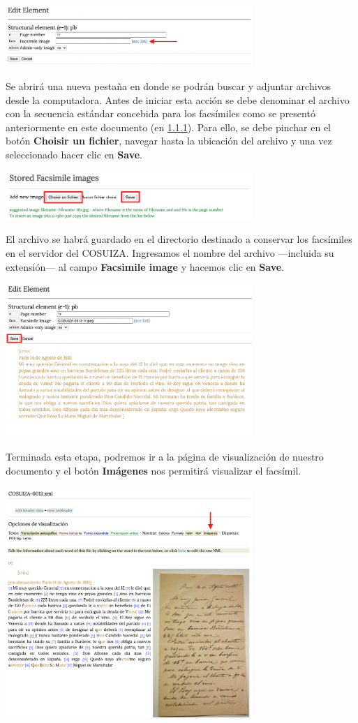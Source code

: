 \documentclass[
]{book}
\begin{document}
\includegraphics[width=0.7\textwidth,height=\textheight]{img/fac2.png}

Se abrirá una nueva pestaña en donde se podrán buscar y adjuntar archivos desde la computadora. Antes de iniciar esta acción se debe denominar el archivo con la secuencia estándar concebida para los facsímiles como se presentó anteriormente en este documento (en \protect\hyperlink{head12345}{1.1.1}).
Para ello, se debe pinchar en el botón \textbf{Choisir un fichier}, navegar hasta la ubicación del archivo y una vez seleccionado hacer clic en \textbf{Save}.

\includegraphics[width=0.7\textwidth,height=\textheight]{img/fac3.png}

El archivo se habrá guardado en el directorio destinado a conservar los facsímiles en el servidor del COSUIZA.
Ingresamos el nombre del archivo ---incluida su extensión--- al campo \textbf{Facsimile image} y hacemos clic en \textbf{Save}.

\includegraphics[width=0.7\textwidth,height=\textheight]{img/fac4.png}

Terminada esta etapa, podremos ir a la página de visualización de nuestro documento y el botón \textbf{Imágenes} nos permitirá visualizar el facsímil.

\includegraphics[width=0.7\textwidth,height=\textheight]{img/fac5.png}
\end{document}
